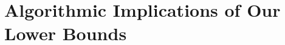 


\section{Algorithmic Implications of Our Lower Bounds}\label{cellprobe:sec:avoid-and-linear-attack}
